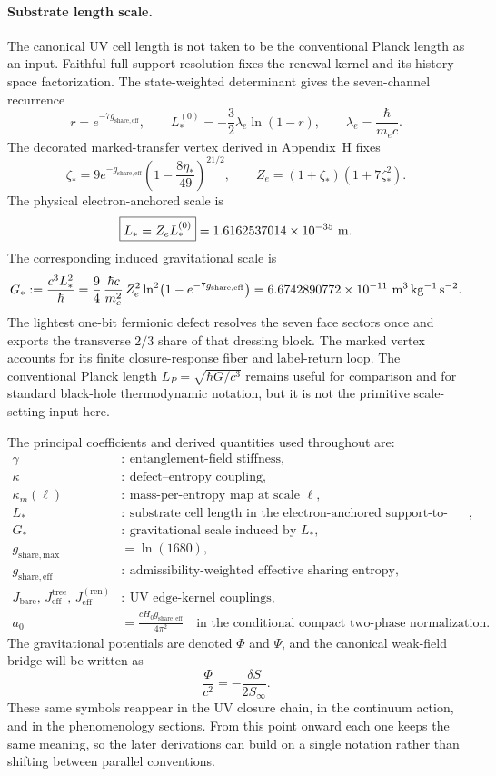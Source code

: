 \documentclass[11pt]{article}
\begin{document}
\paragraph{Substrate length scale.}
The canonical UV cell length is not taken to be the conventional Planck length as an input. Faithful full-support resolution fixes the renewal kernel and its history-space factorization. The state-weighted determinant gives the seven-channel recurrence
\[
r=e^{-7g_{\mathrm{share,eff}}},
\qquad
L_*^{(0)}=-\frac32\lambda_e\ln(1-r),
\qquad \lambda_e=\frac{\hbar}{m_ec}.
\]
The decorated marked-transfer vertex derived in Appendix~H fixes
\[
\zeta_*=9e^{-g_{\mathrm{share,eff}}}
\left(1-\frac{8\eta_*}{49}\right)^{21/2},
\qquad
Z_e=(1+\zeta_*)(1+7\zeta_*^2).
\]
The physical electron-anchored scale is
\[
\boxed{L_*=Z_eL_*^{(0)}}
=1.6162537014\times10^{-35}\ {\rm m}.
\]
The corresponding induced gravitational scale is
\[
G_*:=\frac{c^3L_*^2}{\hbar}
=
\frac94\,\frac{\hbar c}{m_e^2}\,
Z_e^2\ln^2\!\left(1-e^{-7g_{\mathrm{share,eff}}}\right)
=
6.6742890772\times10^{-11}\ {\rm m^3\,kg^{-1}\,s^{-2}}.
\]
The lightest one-bit fermionic defect resolves the seven face sectors once and exports the transverse $2/3$ share of that dressing block. The marked vertex accounts for its finite closure-response fiber and label-return loop. The conventional Planck length $L_P=\sqrt{\hbar G/c^3}$ remains useful for comparison and for standard black-hole thermodynamic notation, but it is not the primitive scale-setting input here.

The principal coefficients and derived quantities used throughout are:
\begin{align}
\gamma &:\ \text{entanglement-field stiffness},\\
\kappa &:\ \text{defect--entropy coupling},\\
\kappa_m(\ell) &:\ \text{mass-per-entropy map at scale }\ell,\\
L_* &:\ \text{substrate cell length in the electron-anchored support-to-rate map},\\
G_* &:\ \text{gravitational scale induced by }L_*,\\
g_{\mathrm{share,max}} &= \ln(1680),\\
g_{\mathrm{share,eff}} &:\ \text{admissibility-weighted effective sharing entropy},\\
J_{\mathrm{bare}},\,J_{\mathrm{eff}}^{\mathrm{tree}},\,J_{\mathrm{eff}}^{(\mathrm{ren})} &:\ \text{UV edge-kernel couplings},\\
a_0 &= \frac{cH_0g_{\mathrm{share,eff}}}{4\pi^2}
\quad\text{in the conditional compact two-phase normalization}.
\end{align}
The gravitational potentials are denoted $\Phi$ and $\Psi$, and the canonical weak-field bridge will be written as
\[
\frac{\Phi}{c^2}=-\frac{\delta S}{2S_\infty}.
\]
These same symbols reappear in the UV closure chain, in the continuum action, and in the phenomenology sections. From this point onward each one keeps the same meaning, so the later derivations can build on a single notation rather than shifting between parallel conventions.
\end{document}
